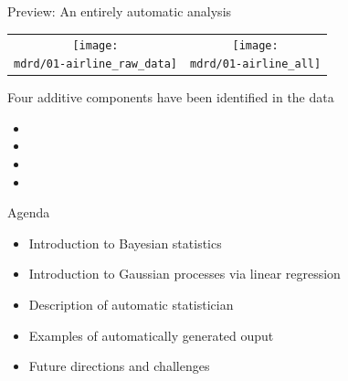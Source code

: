 \begin{frame}{Preview: An entirely automatic analysis}

\newcommand{\wmgd}{0.5\columnwidth}
\newcommand{\hmgd}{3.0cm}
\newcommand{\mdrd}{figures/01-airline}
\newcommand{\mbm}{\hspace{-0.3cm}}
\begin{tabular}{cc}
\mbm \texttt{[image: \\mdrd/01-airline\_raw\_data]} & \texttt{[image: \\mdrd/01-airline\_all]}
\end{tabular}
\vspace{0.5\baselineskip}

{\footnotesize
Four additive components have been identified in the data
\begin{itemize}

  \item  

  \item  

  \item  

  \item  

\end{itemize}
}
\end{frame}

\begin{frame}{Agenda}
  \begin{itemize}
    \item Introduction to Bayesian statistics
    \vspace{\baselineskip}
    \item Introduction to Gaussian processes via linear regression
    \vspace{\baselineskip}
    \item Description of automatic statistician
    \vspace{\baselineskip}
    \item Examples of automatically generated ouput
    \vspace{\baselineskip}
    \item Future directions and challenges
  \end{itemize}
\end{frame}

